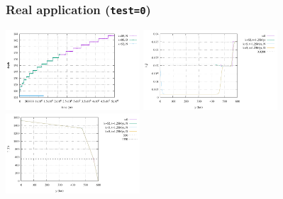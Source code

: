 \subsubsection*{Real application ({\tt test=0})}


\begin{center}
\includegraphics[width=5cm]{python_codes/fieldstone_141/results/test0/depth}
\includegraphics[width=5cm]{python_codes/fieldstone_141/results/test0/heat_flux}
\includegraphics[width=5cm]{python_codes/fieldstone_141/results/test0/temperature}
\end{center}





